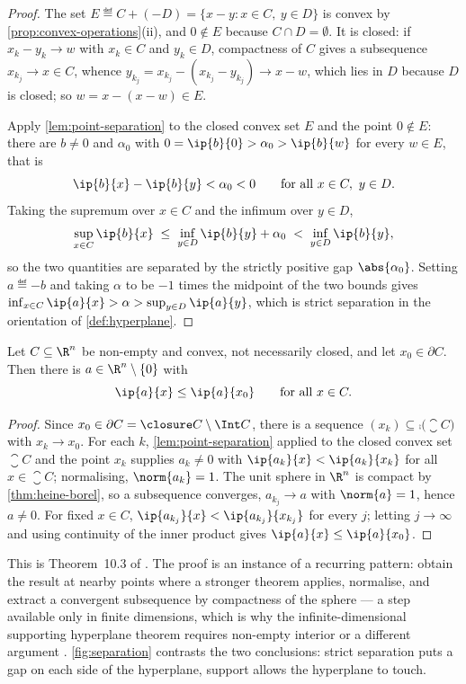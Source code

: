 \begin{proof}
	The set $E\eqdef C+(-D)=\{x-y : x\in C,\ y\in D\}$ is convex by
	\autoref{prop:convex-operations}(ii), and $0\notin E$ because $C\cap D=\emptyset$.
	It is closed: if $x_k-y_k\to w$ with $x_k\in C$ and $y_k\in D$, compactness of
	$C$ gives a subsequence $x_{k_j}\to x\in C$, whence
	$y_{k_j}=x_{k_j}-(x_{k_j}-y_{k_j})\to x-w$, which lies in $D$ because $D$ is
	closed; so $w=x-(x-w)\in E$.

	Apply \autoref{lem:point-separation} to the closed convex set $E$ and the point
	$0\notin E$: there are $b\neq0$ and $\alpha_0$ with
	$0=\ip{b}{0}>\alpha_0>\ip{b}{w}$ for every $w\in E$, that is
	\[
		\ip{b}{x}-\ip{b}{y}<\alpha_0<0
		\qquad\text{for all }x\in C,\ y\in D .
	\]
	Taking the supremum over $x\in C$ and the infimum over $y\in D$,
	\[
		\sup_{x\in C}\ip{b}{x}\;\leq\;\inf_{y\in D}\ip{b}{y}+\alpha_0
		\;<\;\inf_{y\in D}\ip{b}{y},
	\]
	so the two quantities are separated by the strictly positive gap
	$\abs{\alpha_0}$. Setting $a\eqdef-b$ and taking $\alpha$ to be $-1$ times the
	midpoint of the two bounds gives
	$\inf_{x\in C}\ip{a}{x}>\alpha>\sup_{y\in D}\ip{a}{y}$, which is strict
	separation in the orientation of \autoref{def:hyperplane}.
\end{proof}

\begin{theorem}\label{thm:supporting-hyperplane}
	Let $C\subseteq\R^n$ be non-empty and convex, not necessarily closed, and let
	$x_0\in\partial C$. Then there is $a\in\R^n\setminus\{0\}$ with
	\[
		\ip{a}{x}\leq\ip{a}{x_0}\qquad\text{for all }x\in C .
	\]
\end{theorem}

\begin{proof}
	Since $x_0\in\partial C=\closure C\setminus\Int C$, there is a sequence
	$(x_k)\subseteq\comp{\bigl(\closure C\bigr)}$ with $x_k\to x_0$. For each $k$,
	\autoref{lem:point-separation} applied to the closed convex set $\closure C$
	and the point $x_k$ supplies $a_k\neq0$ with
	$\ip{a_k}{x}<\ip{a_k}{x_k}$ for all $x\in\closure C$; normalising,
	$\norm{a_k}=1$. The unit sphere in $\R^n$ is compact by
	\autoref{thm:heine-borel}, so a subsequence converges, $a_{k_j}\to a$ with
	$\norm{a}=1$, hence $a\neq0$. For fixed $x\in C$,
	$\ip{a_{k_j}}{x}<\ip{a_{k_j}}{x_{k_j}}$ for every $j$; letting $j\to\infty$ and
	using continuity of the inner product gives $\ip{a}{x}\leq\ip{a}{x_0}$.
\end{proof}

This is Theorem~10.3 of \textcite[p.~343]{fukuda2026notes}. The proof is an
instance of a recurring pattern: obtain the result at nearby points where a
stronger theorem applies, normalise, and extract a convergent subsequence by
compactness of the sphere --- a step available only in finite dimensions, which
is why the infinite-dimensional supporting hyperplane theorem requires
non-empty interior or a different argument \autocite[Ch.~7]{aliprantis2006infinite}.
\autoref{fig:separation} contrasts the two conclusions: strict separation puts a
gap on each side of the hyperplane, support allows the hyperplane to touch.

